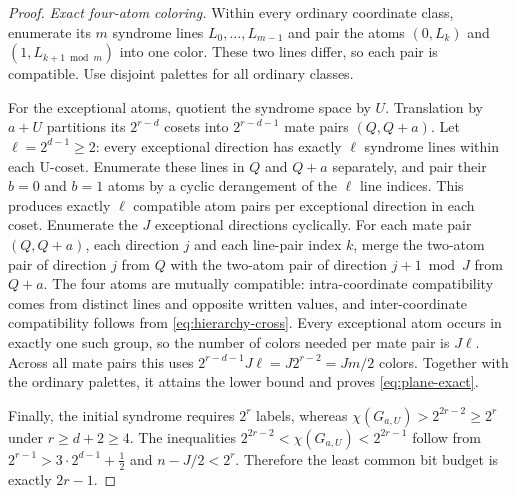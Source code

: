 \documentclass[11pt,a4paper]{article}
\begin{document}
\begin{proof}
\emph{Exact four-atom coloring.}
Within every ordinary coordinate class, enumerate its $m$ syndrome lines
$L_0,\ldots,L_{m-1}$ and pair the atoms $(0,L_k)$ and
$(1,L_{k+1\bmod m})$ into one color. These two lines differ, so each
pair is compatible. Use disjoint palettes for all ordinary classes.

For the exceptional atoms, quotient the syndrome space by $U$. Translation
by $a+U$ partitions its $2^{r-d}$ cosets into $2^{r-d-1}$ mate pairs
$(Q,Q+a)$. Let $\ell=2^{d-1}\ge2$: every exceptional direction has
exactly $\ell$ syndrome lines within each U-coset. Enumerate these lines
in $Q$ and $Q+a$ separately, and pair their $b=0$ and $b=1$ atoms by
a cyclic derangement of the $\ell$ line indices. This produces exactly
$\ell$ compatible atom pairs per exceptional direction in each coset.
Enumerate the $J$ exceptional directions cyclically. For each mate pair
$(Q,Q+a)$, each direction $j$ and each line-pair index $k$, merge the
two-atom pair of direction $j$ from $Q$ with the two-atom pair of direction
$j+1\bmod J$ from $Q+a$. The four atoms are mutually compatible:
intra-coordinate compatibility comes from distinct lines and opposite
written values, and inter-coordinate compatibility follows from
\eqref{eq:hierarchy-cross}. Every exceptional atom occurs in exactly one
such group, so the number of colors needed per mate pair is $J\ell$.
Across all mate pairs this uses
$2^{r-d-1}J\ell=J2^{r-2}=Jm/2$ colors.
Together with the ordinary palettes, it attains the lower bound and
proves \eqref{eq:plane-exact}.

Finally, the initial syndrome requires $2^r$ labels, whereas
$\chi(G_{a,U})>2^{2r-2}\ge2^r$ under $r\ge d+2\ge4$.
The inequalities $2^{2r-2}<\chi(G_{a,U})<2^{2r-1}$ follow from
$2^{r-1}>3\cdot2^{d-1}+\frac12$ and
$n-J/2<2^r$. Therefore the least common bit budget is exactly $2r-1$.
\end{proof}
\end{document}
